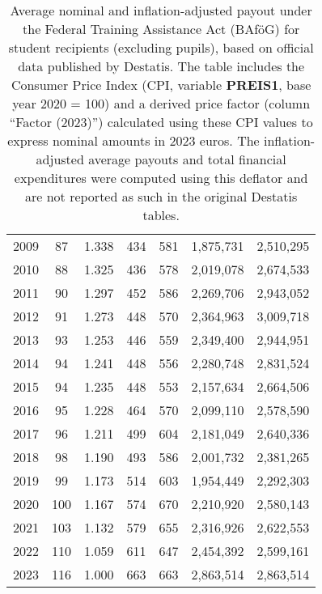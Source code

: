 \begin{table}
\begin{tabular}{rcc|rr|rr}
  2009 & 87 & 1.338 & 434 & 581 & 1,875,731 & 2,510,295 \\
  2010 & 88 & 1.325 & 436 & 578 & 2,019,078 & 2,674,533 \\
  2011 & 90 & 1.297 & 452 & 586 & 2,269,706 & 2,943,052 \\
  2012 & 91 & 1.273 & 448 & 570 & 2,364,963 & 3,009,718 \\
  2013 & 93 & 1.253 & 446 & 559 & 2,349,400 & 2,944,951 \\
  2014 & 94 & 1.241 & 448 & 556 & 2,280,748 & 2,831,524 \\
  2015 & 94 & 1.235 & 448 & 553 & 2,157,634 & 2,664,506 \\
  2016 & 95 & 1.228 & 464 & 570 & 2,099,110 & 2,578,590 \\
  2017 & 96 & 1.211 & 499 & 604 & 2,181,049 & 2,640,336 \\
  2018 & 98 & 1.190 & 493 & 586 & 2,001,732 & 2,381,265 \\
  2019 & 99 & 1.173 & 514 & 603 & 1,954,449 & 2,292,303 \\
  2020 & 100 & 1.167 & 574 & 670 & 2,210,920 & 2,580,143 \\
  2021 & 103 & 1.132 & 579 & 655 & 2,316,926 & 2,622,553 \\
  2022 & 110 & 1.059 & 611 & 647 & 2,454,392 & 2,599,161 \\
  2023 & 116 & 1.000 & 663 & 663 & 2,863,514 & 2,863,514 \\
  \bottomrule
  \end{tabular}
  \caption{
    Average nominal and inflation-adjusted payout under the Federal Training Assistance Act (BAföG) 
    for student recipients (excluding pupils), based on official data published by Destatis.  
    The table includes the Consumer Price Index (CPI, variable \textbf{PREIS1}, base year 2020 = 100) and 
    a derived price factor (column “Factor (2023)”) calculated using these CPI values to express nominal amounts in 2023 euros.  
    The inflation-adjusted average payouts and total financial expenditures were computed using this deflator and are not 
    reported as such in the original Destatis tables.
  }
  \label{table:payout_over_time}
  \end{table}
\endgroup

